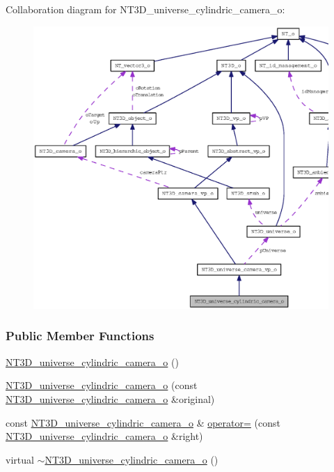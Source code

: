 Collaboration diagram for NT3D\_\-universe\_\-cylindric\_\-camera\_\-o:
\nopagebreak
\begin{figure}[H]
\begin{center}
\leavevmode
\includegraphics[width=400pt]{class_n_t3_d__universe__cylindric__camera__o__coll__graph}
\end{center}
\end{figure}
\subsubsection*{Public Member Functions}
\begin{DoxyCompactItemize}
\item 
\hyperlink{class_n_t3_d__universe__cylindric__camera__o_a0c34dea1a15e509d5442bb6371e40b3c}{NT3D\_\-universe\_\-cylindric\_\-camera\_\-o} ()
\item 
\hyperlink{class_n_t3_d__universe__cylindric__camera__o_a181755ff35d0d763b591b0699d8695b2}{NT3D\_\-universe\_\-cylindric\_\-camera\_\-o} (const \hyperlink{class_n_t3_d__universe__cylindric__camera__o}{NT3D\_\-universe\_\-cylindric\_\-camera\_\-o} \&original)
\item 
const \hyperlink{class_n_t3_d__universe__cylindric__camera__o}{NT3D\_\-universe\_\-cylindric\_\-camera\_\-o} \& \hyperlink{class_n_t3_d__universe__cylindric__camera__o_a79a9d54b3e5f4f79205fcaf04663bed4}{operator=} (const \hyperlink{class_n_t3_d__universe__cylindric__camera__o}{NT3D\_\-universe\_\-cylindric\_\-camera\_\-o} \&right)
\item 
virtual \hyperlink{class_n_t3_d__universe__cylindric__camera__o_a99c86eee74ceb0c726f346a69a3dac50}{$\sim$NT3D\_\-universe\_\-cylindric\_\-camera\_\-o} ()
\end{DoxyCompactItemize}


